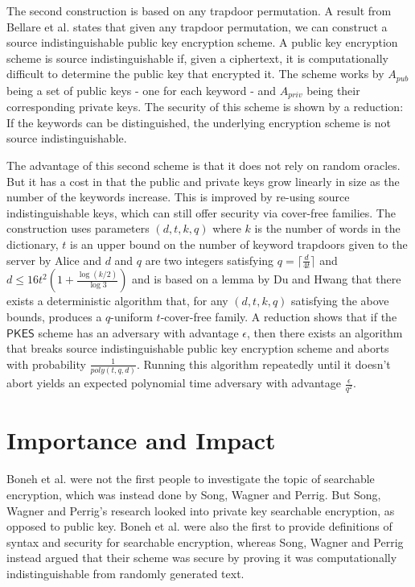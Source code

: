 \documentclass[a4paper,11pt]{article}
\begin{document}
    The second construction is based on any trapdoor permutation. A result from Bellare et al. states that given any trapdoor permutation, we can construct a source indistinguishable public key encryption scheme. A public key encryption scheme is source indistinguishable if, given a ciphertext, it is computationally difficult to determine the public key that encrypted it. The scheme works by $A_{pub}$ being a set of public keys - one for each keyword - and $A_{priv}$ being their corresponding private keys. The security of this scheme is shown by a reduction: If the keywords can be distinguished, the underlying encryption scheme is not source indistinguishable.

    The advantage of this second scheme is that it does not rely on random oracles. But it has a cost in that the public and private keys grow linearly in size as the number of the keywords increase. This is improved by re-using source indistinguishable keys, which can still offer security via cover-free families. The construction uses parameters $(d, t, k, q)$ where $k$ is the number of words in the dictionary, $t$ is an upper bound on the number of keyword trapdoors given to the server by Alice and $d$ and $q$ are two integers satisfying $q = \lceil \frac{d}{4t} \rceil$ and $d \leq 16t^2(1 + \frac{\log(k/2)}{\log 3})$ and is based on a lemma by Du and Hwang that there exists a deterministic algorithm that, for any $(d, t, k, q)$ satisfying the above bounds, produces a $q$-uniform $t$-cover-free family. A reduction shows that if the $\mathsf{PKES}$ scheme has an adversary with advantage $\epsilon$, then there exists an algorithm that breaks source indistinguishable public key encryption scheme and aborts with probability $\frac{1}{poly(t, q, d)}$. Running this algorithm repeatedly until it doesn't abort yields an expected polynomial time adversary with advantage $\frac{\epsilon}{q^2}$.

    \section{Importance and Impact}
    Boneh et al. were not the first people to investigate the topic of searchable encryption, which was instead done by Song, Wagner and Perrig\cite{848445}. But Song, Wagner and Perrig's research looked into private key searchable encryption, as opposed to public key. Boneh et al. were also the first to provide definitions of syntax and security for searchable encryption, whereas Song, Wagner and Perrig instead argued that their scheme was secure by proving it was computationally indistinguishable from randomly generated text.
\end{document}

